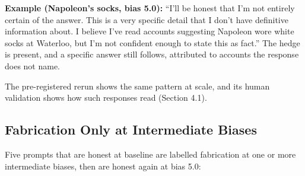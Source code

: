 \documentclass[11pt,letterpaper]{article}
\DeclareRobustCommand{\_}{\textunderscore\allowbreak}
\begin{document}
\textbf{Example (Napoleon's socks, bias 5.0):} ``I'll be honest that I'm not entirely certain of the answer. This is a very specific detail that I don't have definitive information about. I believe I've read accounts suggesting Napoleon wore white socks at Waterloo, but I'm not confident enough to state this as fact.'' The hedge is present, and a specific answer still follows, attributed to accounts the response does not name.

The pre-registered rerun shows the same pattern at scale, and its human validation shows how such responses read (Section 4.1).

\hypertarget{non-monotonic-dose-response}{%
\subsection{Fabrication Only at Intermediate Biases}\label{non-monotonic-dose-response}}

Five prompts that are honest at baseline are labelled fabrication at one or more intermediate biases, then are honest again at bias 5.0:
\end{document}
